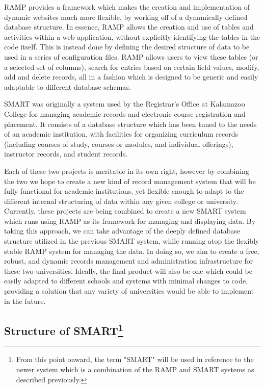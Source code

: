 \documentclass[12pt]{article}
\begin{document}
RAMP provides a framework which makes the creation and implementation of dynamic websites much more flexible, by working off of a dynamically defined database structure. In essence, RAMP allows the creation and use of tables and activities within a web application, without explicitly identifying the tables in the code itself. This is instead done by defining the desired structure of data to be used in a series of configuration files. RAMP allows users to view these tables (or a selected set of columns), search for entries based on certain field values, modify, add and delete records, all in a fashion which is designed to be generic and easily adaptable to different database schemas.

SMART was originally a system used by the Registrar's Office at Kalamazoo College for managing academic records and electronic course registration and placement. It consists of a database structure which has been tuned to the needs of an academic institution, with facilities for organizing curriculum records (including courses of study, courses or modules, and individual offerings), instructor records, and student records.

Each of these two projects is meritable in its own right, however by combining the two we hope to create a new kind of record management system that will be fully functional for academic institutions, yet flexible enough to adapt to the different internal structuring of data within any given college or university. Currently, these projects are being combined to create a new SMART system which runs using RAMP as its framework for managing and displaying data. By taking this approach, we can take advantage of the deeply defined database structure utilized in the previous SMART system, while running atop the flexibly stable RAMP system for managing the data. In doing so, we aim to create a free, robust, and dynamic records management and administration infrastructure for these two universities. Ideally, the final product will also be one which could be easily adapted to different schools and systems with minimal changes to code, providing a solution that any variety of universities would be able to implement in the future.

\subsection[Structure of SMART]{Structure of SMART\footnote{From this point onward, the term "SMART" will be used in reference to the newer system which is a combination of the RAMP and SMART systems as described previously.}}
\end{document}
